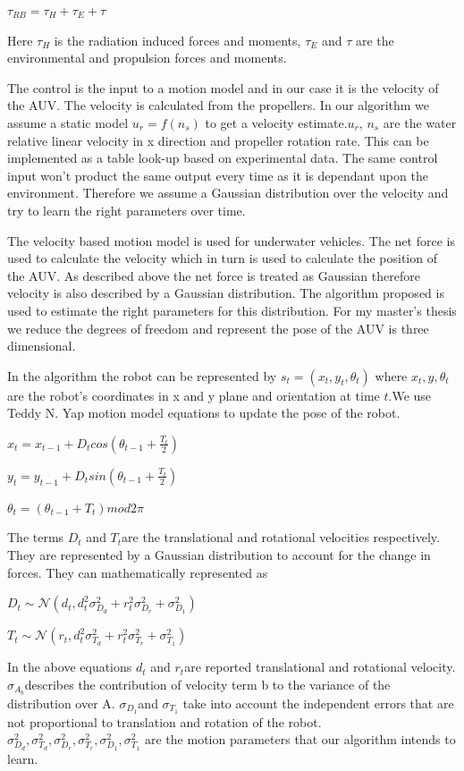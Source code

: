 \documentclass[12pt]{dalcsthesis}
\begin{document}
$\tau_{RB}=\tau_{H}+\tau_{E}+\tau$

Here $\tau_{H}$ is the radiation induced forces and moments, $\tau_{E}$
and $\tau$ are the environmental and propulsion forces and moments.

The control is the input to a motion model and in our case it is the velocity of the AUV. The velocity is calculated from the propellers. In our algorithm we assume a static model $u_{r}=f(n_{s})$ to get a velocity estimate.$u_{r}$, $n_{s}$ are the water relative linear velocity in x direction and propeller rotation rate. This can be implemented as a table look-up based on experimental data.
The same control input won't product the same output every time as it is dependant upon the environment. Therefore we assume a Gaussian distribution over the velocity and try to learn the right parameters over time. 

The velocity based motion model is used for underwater vehicles. The
net force is used to calculate the velocity which in turn is used
to calculate the position of the AUV. As described above the net force
is treated as Gaussian therefore velocity is also described by a Gaussian
distribution. The algorithm proposed is used to estimate the right
parameters for this distribution. For my master's thesis we reduce
the degrees of freedom and represent the pose of the AUV is three
dimensional. 

In the algorithm the robot can be represented by $s_{t}=(x_{t},y_{t},\theta_{t})$
where $x_{t},y,\theta_{t}$ are the robot's coordinates in x and y
plane and orientation at time $t$.We use Teddy N. Yap motion model
equations to update the pose of the robot.

$x_{t}=x_{t-1}+D_{t}cos(\theta_{t-1}+\frac{T_{t}}{2})$

$y_{t}=y_{t-1}+D_{t}sin(\theta_{t-1}+\frac{T_{t}}{2})$

$\theta_{t}=(\theta_{t-1}+T_{t})mod2\pi$


The terms $D_{t}$ and $T_{t}$are the translational and rotational
velocities respectively. They are represented by a Gaussian distribution
to account for the change in forces. They can mathematically represented
as 

$D_{t}\sim\mathcal{{N}}(d_{t},d_{t}^{2}\sigma_{D_{d}}^{2}+r_{t}^{2}\sigma_{D_{r}}^{2}+\sigma_{D_{1}}^{2})$

$T_{t}\sim\mathcal{{N}}(r_{t},d_{t}^{2}\sigma_{T_{d}}^{2}+r_{t}^{2}\sigma_{T_{r}}^{2}+\sigma_{T_{1}}^{2})$

In the above equations $d_{t}$ and $r_{t}$are reported translational
and rotational velocity. $\sigma_{A_{b}}$describes the contribution
of velocity term b to the variance of the distribution over A. $\sigma_{D_{1}}$and
$\sigma_{T_{1}}$ take into account the independent errors that are
not proportional to translation and rotation of the robot. $\sigma_{D_{d}}^{2}\ensuremath{,}\sigma_{T_{d}}^{2}\ensuremath{,}\sigma_{D_{r}}^{2}\ensuremath{,}\sigma_{T_{r}}^{2}\ensuremath{,}\sigma_{D_{1}}^{2}\ensuremath{,}\sigma_{T_{1}}^{2}$
are the motion parameters that our algorithm intends to learn. 
 
\end{document}
